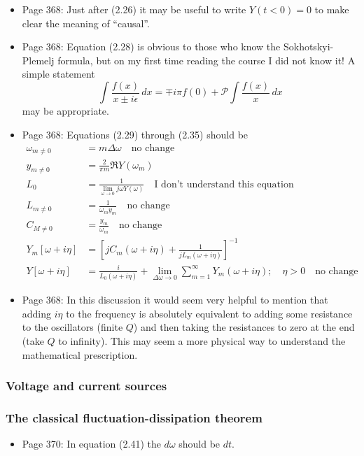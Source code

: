 \documentclass{article}
\begin{document}
\begin{itemize}

\item Page 368: Just after (2.26) it may be useful to write $Y(t<0)=0$ to make clear the meaning of ``causal''.

\item Page 368: Equation (2.28) is obvious to those who know the Sokhotskyi-Plemelj formula, but on my first time reading the course I did not know it! A simple statement
\begin{equation}
\int \frac{f(x)}{x \pm i \epsilon} \, dx =
\mp i \pi f(0) + \mathcal{P} \int \frac{f(x)}{x}\, dx
\end{equation}
may be appropriate.

\item Page 368: Equations (2.29) through (2.35) should be
\begin{align*}
\omega_{m \neq 0} &= m \Delta \omega \quad \text{no change} \\
y_{m \neq 0} &= \frac{2}{\pi m} \Re Y(\omega_m) \\
L_0 &= \frac{1}{\lim_{\omega \rightarrow 0} j \omega Y(\omega)} \quad \text{I don't understand this equation} \\
L_{m \neq 0} &= \frac{1}{\omega_m y_m} \quad \text{no change} \\
C_{M \neq 0} &= \frac{y_m}{\omega_m} \quad \text{no change} \\
Y_m [\omega + i \eta] &= \left[ j C_m(\omega + i \eta) + \frac{1}{j L_m (\omega + i \eta)} \right] ^{-1} \\
Y[\omega + i \eta] &= \frac{i}{L_0(\omega + i \eta)} + \lim_{\Delta \omega \rightarrow 0}
\sum_{m=1}^\infty Y_m(\omega + i \eta); \quad \eta > 0 \quad \text{no change}
\end{align*}

\item Page 368: In this discussion it would seem very helpful to mention that adding $i \eta$ to the frequency is absolutely equivalent to adding some resistance to the oscillators (finite $Q$) and then taking the resistances to zero at the end (take $Q$ to infinity). This may seem a more physical way to understand the mathematical prescription.

\end{itemize}

\subsubsection{Voltage and current sources}

\subsubsection{The classical fluctuation-dissipation theorem}

\begin{itemize}

\item Page 370: In equation (2.41) the $d\omega$ should be $dt$.

\end{itemize}
\end{document}
